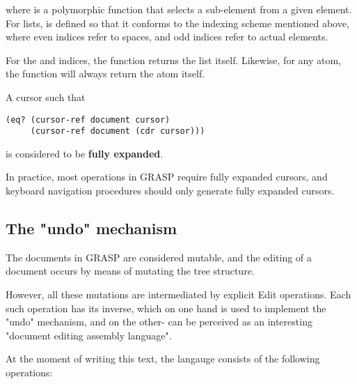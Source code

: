 \documentclass[11pt]{article}
\begin{document}
where is a polymorphic function that selects
a sub-element from a given element. For lists,
is defined so that it conforms to the indexing
scheme mentioned above, where even indices refer
to spaces, and odd indices refer to actual elements.

For the and indices, the 
function returns the list itself. 
Likewise, for any atom, the function will
always return the atom itself.

A cursor such that 
\begin{verbatim}
(eq? (cursor-ref document cursor)
     (cursor-ref document (cdr cursor)))
\end{verbatim}
is considered to be \textbf{fully expanded}.

In practice, most operations in GRASP require
fully expanded cursors, and keyboard navigation
procedures should only generate fully expanded
cursors.

\subsection{The "undo" mechanism}
\label{sec:org7183980}

The documents in GRASP are considered mutable,
and the editing of a document occurs by means
of mutating the tree structure.

However, all these mutations are intermediated
by explicit Edit operations. Each such operation
has its inverse, which on one hand is used to
implement the "undo" mechanism, and on 
the other- can be perceived as an interesting 
"document editing assembly language".

At the moment of writing this text, the langauge
consists of the following operations:
\end{document}
